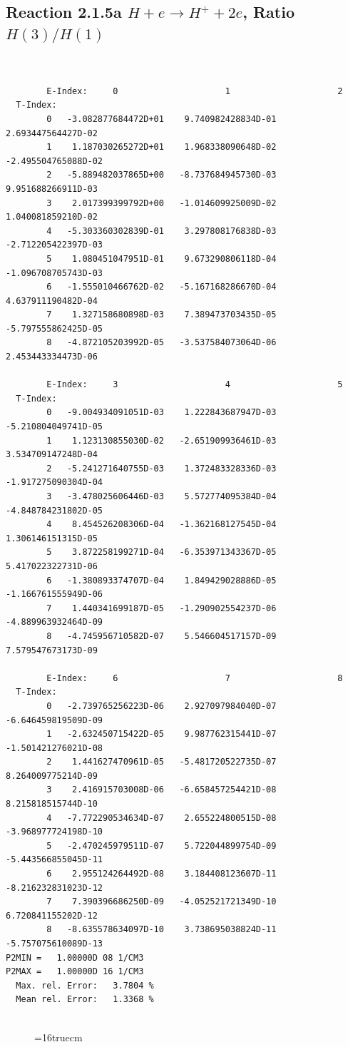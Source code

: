 \documentclass[12pt,dvipdfmx]{article}
\begin{document}
\subsection{
Reaction 2.1.5a  $H + e \rightarrow H^+ + 2e $, Ratio $H(3)/H(1)$
}

\begin{small}\begin{verbatim}


        E-Index:     0                     1                     2
  T-Index:
        0   -3.082877684472D+01    9.740982428834D-01    2.693447564427D-02
        1    1.187030265272D+01    1.968338090648D-02   -2.495504765088D-02
        2   -5.889482037865D+00   -8.737684945730D-03    9.951688266911D-03
        3    2.017399399792D+00   -1.014609925009D-02    1.040081859210D-02
        4   -5.303360302839D-01    3.297808176838D-03   -2.712205422397D-03
        5    1.080451047951D-01    9.673290806118D-04   -1.096708705743D-03
        6   -1.555010466762D-02   -5.167168286670D-04    4.637911190482D-04
        7    1.327158680898D-03    7.389473703435D-05   -5.797555862425D-05
        8   -4.872105203992D-05   -3.537584073064D-06    2.453443334473D-06

        E-Index:     3                     4                     5
  T-Index:
        0   -9.004934091051D-03    1.222843687947D-03   -5.210804049741D-05
        1    1.123130855030D-02   -2.651909936461D-03    3.534709147248D-04
        2   -5.241271640755D-03    1.372483328336D-03   -1.917275090304D-04
        3   -3.478025606446D-03    5.572774095384D-04   -4.848784231802D-05
        4    8.454526208306D-04   -1.362168127545D-04    1.306146151315D-05
        5    3.872258199271D-04   -6.353971343367D-05    5.417022322731D-06
        6   -1.380893374707D-04    1.849429028886D-05   -1.166761555949D-06
        7    1.440341699187D-05   -1.290902554237D-06   -4.889963932464D-09
        8   -4.745956710582D-07    5.546604517157D-09    7.579547673173D-09

        E-Index:     6                     7                     8
  T-Index:
        0   -2.739765256223D-06    2.927097984040D-07   -6.646459819509D-09
        1   -2.632450715422D-05    9.987762315441D-07   -1.501421276021D-08
        2    1.441627470961D-05   -5.481720522735D-07    8.264009775214D-09
        3    2.416915703008D-06   -6.658457254421D-08    8.215818515744D-10
        4   -7.772290534634D-07    2.655224800515D-08   -3.968977724198D-10
        5   -2.470245979511D-07    5.722044899754D-09   -5.443566855045D-11
        6    2.955124264492D-08    3.184408123607D-11   -8.216232831023D-12
        7    7.390396686250D-09   -4.052521721349D-10    6.720841155202D-12
        8   -8.635578634097D-10    3.738695038824D-11   -5.757075610089D-13
P2MIN =   1.00000D 08 1/CM3
P2MAX =   1.00000D 16 1/CM3
  Max. rel. Error:   3.7804 %
  Mean rel. Error:   1.3368 %


\end{verbatim}\end{small}
\begin{figure} \label{2.1.5a}
\epsfxsize=16truecm
\end{figure}
\end{document}
